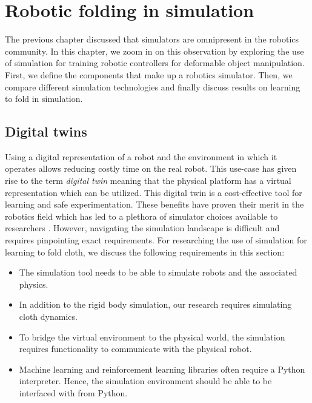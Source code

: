 \documentclass[\home/main.tex]{subfiles}
\begin{document}
\graphicspath{{\home/figures}}


\chapter{Robotic folding in simulation}\label{ch:simulation}


The previous chapter discussed that simulators are omnipresent in the robotics community.
In this chapter, we zoom in on this observation by exploring the use of simulation for training robotic controllers for deformable object manipulation. First, we define the components that make up a robotics simulator. Then, we compare different simulation technologies and finally discuss results on learning to fold in simulation.

\section{Digital twins}

Using a digital representation of a robot and the environment in which it operates allows reducing costly time on the real robot. This use-case has given rise to the term \emph{digital twin} meaning that the physical platform has a virtual representation which can be utilized. This digital twin is a cost-effective tool for learning and safe experimentation. These benefits have proven their merit in the robotics field which has led to a plethora of simulator choices available to researchers \autocite{Collins2021}. However, navigating the simulation landscape is difficult and requires pinpointing exact requirements. For researching the use of simulation for learning to fold cloth, we discuss the following requirements in this section:
\begin{itemize}
    \item The simulation tool needs to be able to simulate robots and the associated physics.
    \item In addition to the rigid body simulation, our research requires simulating cloth dynamics.
    \item To bridge the virtual environment to the physical world, the simulation requires functionality to communicate with the physical robot.
    \item Machine learning and reinforcement learning libraries often require a Python interpreter. Hence, the simulation environment should be able to be interfaced with from Python.
\end{itemize}
\end{document}
